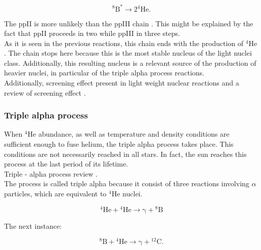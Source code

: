 \documentclass[openany]{book}
\begin{document}
\begin{equation} \label{eq:reaction_8Bdisintegration}
	{}^{8}\mathrm{B^{*}} \rightarrow 2{}^{4}\mathrm{He}.
\end{equation}

The ppII is more unlikely than the ppIII chain \cite{bertulani_2003}. This might be explained by the fact that ppII proceeds in two  while ppIII in three steps. \\

As it is seen in the previous reactions, this chain ends with the production of $\mathrm{{}^{4}He}$. The chain stops here because this is the most stable nucleus of the light nuclei class. Additionally, this resulting nucleus is a relevant source of the production of heavier nuclei, in particular of the triple alpha process reactions. \\

Additionally, screening effect present in light weight nuclear reactions \cite{raiola_migliardi_gyurky_aliotta_formicola_bonetti_broggini_campajola_corvisiero_costantini_et_2002} and a review of screening effect \cite{assenbaum_langanke_rolfs_1987}.

\subsubsection{Triple alpha process}

When $\mathrm{{}^{4}He}$ abundance, as well as temperature and density conditions are sufficient enough to fuse helium, the triple alpha process takes place. This conditions are not necessarily reached in all stars. In fact, the sun reaches this process at the last period of its lifetime.   \\

Triple - alpha process review \cite{coc_2012}. \\

The process is called triple alpha because it consist of three reactions involving $\alpha$ particles, which are equivalent to  $\mathrm{{}^{4}He}$ nuclei. 

\begin{equation}\label{eq:reaction_tripleAlpha_1}
	\mathrm{{}^{4}He + {}^{4}He \rightarrow  \gamma  + {}^{8}B }
\end{equation}

The next instance:

\begin{equation}\label{eq:reaction_tripleAlpha_2}
	\mathrm{{}^{8}B+ {}^{4}He \rightarrow  \gamma + {}^{12}C}. 
\end{equation}
\end{document}
